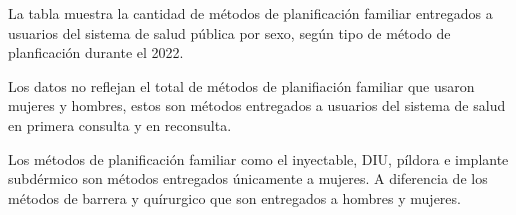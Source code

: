 La tabla muestra la cantidad de métodos de planificación familiar entregados a usuarios del sistema de salud pública por sexo, según tipo de método de planficación durante el 2022. 

Los datos no reflejan el total de métodos de planifiación familiar que usaron mujeres y hombres, estos son métodos entregados a usuarios del sistema de salud en primera consulta y en reconsulta. 

Los métodos de planificación familiar como el inyectable, DIU, píldora e implante subdérmico son métodos entregados únicamente a mujeres. A diferencia de los métodos de barrera y quírurgico que son entregados a hombres y mujeres. 